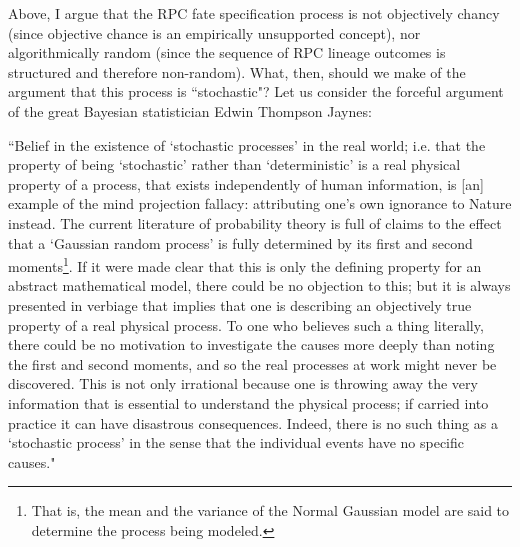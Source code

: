 Above, I argue that the RPC fate specification process is not objectively chancy (since objective chance is an empirically unsupported concept), nor algorithmically random (since the sequence of RPC lineage outcomes is structured and therefore non-random). What, then, should we make of the argument that this process is ``stochastic"? Let us consider the forceful argument of the great Bayesian statistician Edwin Thompson Jaynes:

\begin{longquote}
 ``Belief in the existence of ‘stochastic processes’ in the real world; i.e. that the property of being ‘stochastic’ rather than ‘deterministic’ is a real physical property of a process, that exists independently of human information, is [an] example of the mind projection fallacy: attributing one’s own ignorance to Nature instead. The current literature of probability theory is full of claims to the effect that a ‘Gaussian random process’ is fully determined by its first and second moments\footnote{That is, the mean and the variance of the Normal Gaussian model are said to determine the process being modeled.}. If it were made clear that this is only the defining property for an abstract mathematical model, there could be no objection to this; but it is always presented in verbiage that implies that one is describing an objectively true property of a real physical process. To one who believes such a thing literally, there could be no motivation to investigate the causes more deeply than noting the first and second moments, and so the real processes at work might never be discovered. This is not only irrational because one is throwing away the very information that is essential to understand the physical process; if carried into practice it can have disastrous consequences. Indeed, there is no such thing as a ‘stochastic process’ in the sense that the individual events have no specific causes." \cite{Jaynes2003}
 \end{longquote}
 
